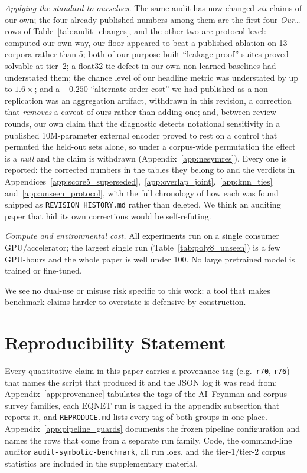 \emph{Applying the standard to ourselves.} The same audit has now changed \emph{six} claims of our own; the four already-published numbers among them are the first four \emph{Our\dots} rows of Table~\ref{tab:audit_changes}, and the other two are protocol-level: computed our own way, our floor appeared to beat a published ablation on 13 corpora rather than 5; both of our purpose-built ``leakage-proof'' suites proved solvable at tier~2; a float32 tie defect in our own non-learned baselines had understated them; the chance level of our headline metric was understated by up to $1.6\times$; and a $+0.250$ ``alternate-order cost'' we had published as a non-replication was an aggregation artifact, withdrawn in this revision, a correction that \emph{removes} a caveat of ours rather than adding one; and, between review rounds, our own claim that the diagnostic detects notational sensitivity in a published 10M-parameter external encoder proved to rest on a control that permuted the held-out sets alone, so under a corpus-wide permutation the effect is a \emph{null} and the claim is withdrawn (Appendix~\ref{app:nesymres}). Every one is reported: the corrected numbers in the tables they belong to and the verdicts in Appendices~\ref{app:score5_superseded},~\ref{app:overlap_joint},~\ref{app:knn_ties} and~\ref{app:unseen_protocol}, with the full chronology of how each was found shipped as \texttt{REVISION\_HISTORY.md} rather than deleted. We think an auditing paper that hid its own corrections would be self-refuting.

\emph{Compute and environmental cost.} All experiments run on a single consumer GPU/accelerator; the largest single run (Table~\ref{tab:poly8_unseen}) is a few GPU-hours and the whole paper is well under 100. No large pretrained model is trained or fine-tuned.

We see no dual-use or misuse risk specific to this work: a tool that makes benchmark claims harder to overstate is defensive by construction.

\section*{Reproducibility Statement}

Every quantitative claim in this paper carries a provenance tag (e.g.\ \texttt{r70}, \texttt{r76}) that names the script that produced it and the JSON log it was read from; Appendix~\ref{app:provenance} tabulates the tags of the AI~Feynman and corpus-survey families, each EQNET run is tagged in the appendix subsection that reports it, and \texttt{REPRODUCE.md} lists every tag of both groups in one place. Appendix~\ref{app:pipeline_guards} documents the frozen pipeline configuration and names the rows that come from a separate run family. Code, the command-line auditor \texttt{audit-symbolic-benchmark}, all run logs, and the tier-1/tier-2 corpus statistics are included in the supplementary material.

